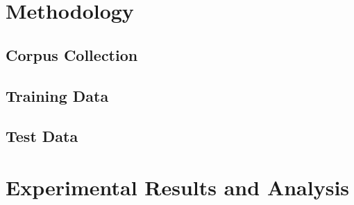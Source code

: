 \documentclass[12pt]{book} %
\begin{document}





    

\chapter{Methodology}
\section{Corpus Collection}
\section{Training Data}
\section{Test Data}











\chapter{Experimental Results and Analysis}

\end{document}
